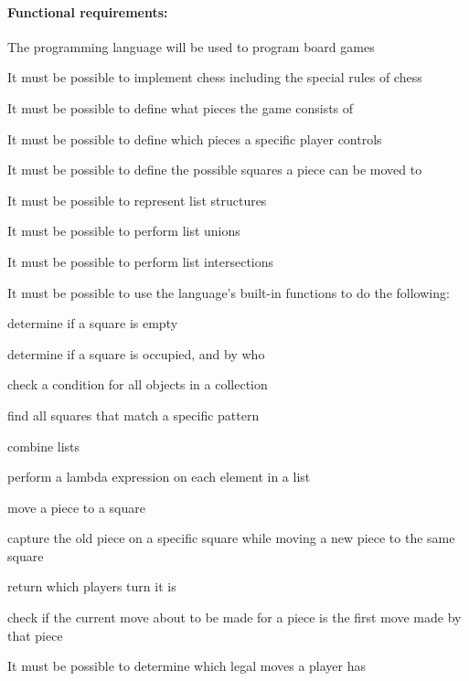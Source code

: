\paragraph*{Functional requirements:}
\begin{nlist}
  \item The programming language will be used to program board games
  \begin{nlist}
    \item It must be possible to implement chess including the special rules of
      chess
  \end{nlist}
  \item It must be possible to define what pieces the game consists of
  \item It must be possible to define which pieces a specific player controls
  \item It must be possible to define the possible squares a piece can be moved
    to
  \item It must be possible to represent list structures
  \begin{nlist}
    \item It must be possible to perform list unions
    \item It must be possible to perform list intersections
  \end{nlist}
  \item It must be possible to use the language’s built-in functions to do the
    following:
  \begin{nlist}
    \item determine if a square is empty
    \item determine if a square is occupied, and by who
    \item check a condition for all objects in a collection
    \item find all squares that match a specific pattern
    \item combine lists
    \item perform a lambda expression on each element in a list
    \item move a piece to a square
    \item capture the old piece on a specific square while moving a new piece to
      the same square
    \item return which players turn it is
    \item check if the current move about to be made for a piece is the first
      move made by that piece
  \end{nlist}
  \item It must be possible to determine which legal moves a player has

\end{nlist}
